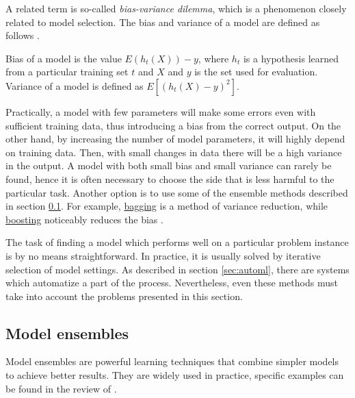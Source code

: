 A related term is so-called \emph{bias-variance dilemma}, which is a phenomenon
closely related to model selection. The bias and variance of a model are
defined as follows \citep[p.59,~356]{CaseBerg:01}.

\begin{definition}
Bias of a model is the value $E(h_t(X)) - y$, where $h_t$ is a
hypothesis learned from a particular training set $t$ and $X$ and $y$ is the
set used for evaluation. Variance of a model is defined as $E[(h_t(X) - y)^2]$.
\end{definition}

Practically, a model with few parameters will make some errors even with
sufficient training data, thus introducing a bias from the correct output.
On the other hand, by  increasing the number of model parameters, it will
highly depend on training data. Then, with small changes in data there will be
a high variance in the output. A model with both small bias and small variance
can rarely be found, hence it is often necessary to choose the side that is
less harmful to the particular task. Another option
is to use some of the ensemble methods described in section \ref{ensemble}. For
example, \hyperref[bagging]{bagging} is a method of variance reduction, while
\hyperref[boosting]{boosting} noticeably reduces the bias
\citep[p.~93--94,~338]{Flach:2012:MLA:2490546}.

The task of finding a model which performs well on a particular problem
instance is by no means straightforward. In practice, it is usually solved by
iterative selection of model settings. As described in section \ref{sec:automl},
there are systems which automatize a part of the process. Nevertheless, even
these methods must take into account the problems presented in this section.

\subsection{Model ensembles} \label{ensemble}
Model ensembles are powerful learning techniques that combine simpler models 
to achieve better results. They are widely used in practice, specific examples
can be found in the review of \cite{Rokach:2009:TCE:1609202.1609436}.

